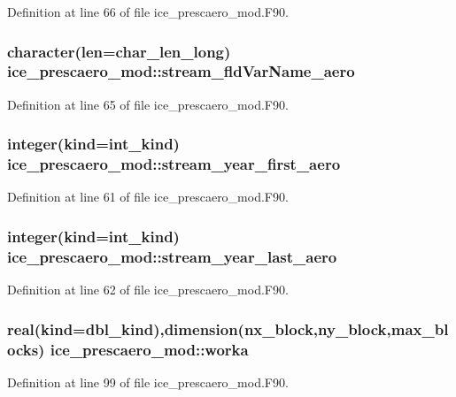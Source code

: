 Definition at line 66 of file ice\_\-prescaero\_\-mod.F90.\hypertarget{namespaceice__prescaero__mod_a92f0e6afee8f0fce04d39a9b726579c4}{
\subsubsection[{stream\_\-fldVarName\_\-aero}]{\setlength{\rightskip}{0pt plus 5cm}character(len=char\_\-len\_\-long) {\bf ice\_\-prescaero\_\-mod::stream\_\-fldVarName\_\-aero}}}
\label{namespaceice__prescaero__mod_a92f0e6afee8f0fce04d39a9b726579c4}


Definition at line 65 of file ice\_\-prescaero\_\-mod.F90.\hypertarget{namespaceice__prescaero__mod_a707a18c373ea6a3f7aa42d9a1872f322}{
\subsubsection[{stream\_\-year\_\-first\_\-aero}]{\setlength{\rightskip}{0pt plus 5cm}integer(kind=int\_\-kind) {\bf ice\_\-prescaero\_\-mod::stream\_\-year\_\-first\_\-aero}}}
\label{namespaceice__prescaero__mod_a707a18c373ea6a3f7aa42d9a1872f322}


Definition at line 61 of file ice\_\-prescaero\_\-mod.F90.\hypertarget{namespaceice__prescaero__mod_ae0ffc599bd1d380d44541bac8026fc8d}{
\subsubsection[{stream\_\-year\_\-last\_\-aero}]{\setlength{\rightskip}{0pt plus 5cm}integer(kind=int\_\-kind) {\bf ice\_\-prescaero\_\-mod::stream\_\-year\_\-last\_\-aero}}}
\label{namespaceice__prescaero__mod_ae0ffc599bd1d380d44541bac8026fc8d}


Definition at line 62 of file ice\_\-prescaero\_\-mod.F90.\hypertarget{namespaceice__prescaero__mod_a425d07f2285f906fd3d7feb2590c6381}{
\subsubsection[{worka}]{\setlength{\rightskip}{0pt plus 5cm}real(kind=dbl\_\-kind),dimension(nx\_\-block,ny\_\-block,max\_\-blocks) {\bf ice\_\-prescaero\_\-mod::worka}}}
\label{namespaceice__prescaero__mod_a425d07f2285f906fd3d7feb2590c6381}


Definition at line 99 of file ice\_\-prescaero\_\-mod.F90.